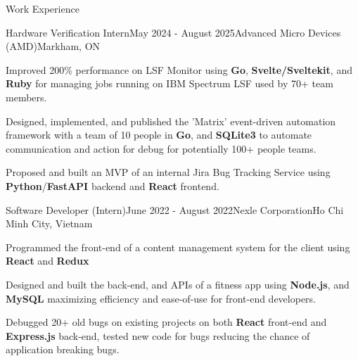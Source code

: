 \documentclass[
	11pt, %
]{resume} %
\begin{document}


\begin{rSection}{Work Experience}

	\begin{rSubsection}{Hardware Verification Intern}{May 2024 - August 2025}{Advanced Micro Devices (AMD)}{Markham, ON}
	\item Improved 200\% performance on LSF Monitor using \textbf{Go}, \textbf{Svelte/Sveltekit}, and \textbf{Ruby} for managing jobs running on IBM Spectrum LSF used by 70+ team members.
	\item Designed, implemented, and published the 'Matrix' event-driven automation framework with a team of 10 people in \textbf{Go}, and \textbf{SQLite3} to automate communication and action for debug for potentially 100+ people teams.
	\item Proposed and built an MVP of an internal Jira Bug Tracking Service using \textbf{Python}/\textbf{FastAPI} backend and \textbf{React} frontend.
	\end{rSubsection}

	\begin{rSubsection}{Software Developer (Intern)}{June 2022 - August 2022}{Nexle Corporation}{Ho Chi Minh City, Vietnam}
		\item Programmed the front-end of a content management system for the client using \textbf{React} and \textbf{Redux}
		\item Designed and built the back-end, and APIs of a fitness app using \textbf{Node.js}, and \textbf{MySQL} maximizing efficiency and ease-of-use for front-end developers.
		\item Debugged 20+ old bugs on existing projects on both \textbf{React} front-end and \textbf{Express.js} back-end, tested new code for bugs reducing the chance of application breaking bugs.
	\end{rSubsection}


\end{rSection}
\end{document}
